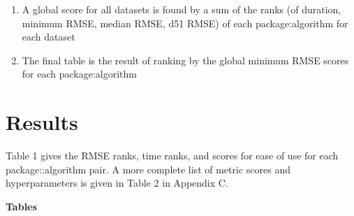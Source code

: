 \begin{enumerate}
\def\labelenumi{\arabic{enumi}.}
\setcounter{enumi}{3}
\tightlist
\item
  A global score for all datasets is found by a sum of the ranks (of
  duration, minimum RMSE, median RMSE, d51 RMSE) of each
  package:algorithm for each dataset
\item
  The final table is the result of ranking by the global minimum RMSE
  scores for each package:algorithm
\end{enumerate}

\hypertarget{results}{%
\section{Results}\label{results}}

Table 1 gives the RMSE ranks, time ranks, and scores for ease of use for
each package::algorithm pair. A more complete list of metric scores and
hyperparameters is given in Table 2 in Appendix C.

\textbf{Tables}

